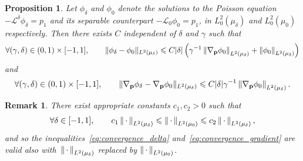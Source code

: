\documentclass[11pt,a4paper]{article}
\newcommand{\dummy}{\,\cdot\,}
\newcommand{\grad}{\nabla}
\newcommand{\vect}[1]{\boldsymbol{\mathbf #1}}
\renewcommand{\d}{\mathrm d}
\theoremstyle{plain}
\newtheorem{proposition}{Proposition}[section]
\newtheorem{remark}{Remark}[section]
\numberwithin{equation}{section}
\renewcommand{\leq}{\leqslant}
\begin{document}
\begin{proposition}
    \label{proposition:convergence_gradient}
    Let $\phi_{\delta}$ and $\phi_0$ denote the solutions to the Poisson equation $- \mathcal L^{\delta} \phi_{\delta} = p_1$
    and its separable counterpart $- \mathcal L_0 \phi_0 = p_1$,
    in $L^2_0(\mu_{\delta})$ and $L^2_0(\mu_0)$ respectively.
    Then there exists $C$ independent of $\delta$ and $\gamma$ such that
    \begin{align}
        \label{eq:convergence_delta}
        \forall (\gamma, \delta) \in (0, 1) \times [-1, 1], \qquad
        \norm*{\phi_\delta - \phi_0}[L^2(\mu_{\delta})]
        \leq C\lvert \delta \rvert \left(
              \gamma^{-1} \norm{\grad_{\vect p} \phi_0}[L^2(\mu_{\delta})]
            + \norm{\phi_0}[L^2(\mu_{\delta})]
        \right)
    \end{align}
    and
    \begin{align}
        \label{eq:convergence_gradient}
        \forall (\gamma, \delta) \in (0, 1) \times [-1, 1], \qquad
        \norm*{\grad_{\vect p} \phi_\delta - \grad_{\vect p} \phi_0}[L^2(\mu_{\delta})]
        \leq C \lvert \delta \rvert  \gamma^{-1} \norm{\grad_{\vect p} \phi_0}[L^2(\mu_{\delta})] .
    \end{align}
\end{proposition}
\begin{remark}
    There exist appropriate constants $c_1, c_2 > 0$ such that
    \[
        \forall \delta \in [-1, 1], \qquad
        c_1 \norm{\dummy}[L^2(\mu_{\delta})] \leq \norm{\dummy}[L^2(\mu_0)] \leq c_2 \norm{\dummy}[L^2(\mu_{\delta})],
    \]
    and so the inequalities~\eqref{eq:convergence_delta} and~\eqref{eq:convergence_gradient} are valid also with~$\norm{\dummy}[L^2(\mu_{\delta})]$ replaced by $\norm{\dummy}[L^2(\mu_{0})]$.
\end{remark}
\end{document}
